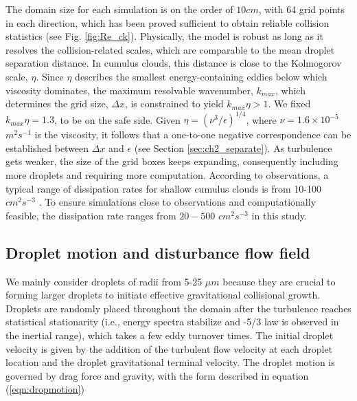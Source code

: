 The domain size for each simulation is on the order of $10cm$, with 64 grid points in each direction, which has been proved sufficient to obtain reliable collision statistics (see Fig. \ref{fig:Re_ck}). Physically, the model is robust as long as it resolves the collision-related scales, which are comparable to the mean droplet separation distance. In cumulus clouds, this distance is close to the Kolmogorov scale, $\eta$. Since $\eta$ describes the smallest energy-containing eddies below which viscosity dominates, the maximum resolvable wavenumber, $k_{max}$, which determines the grid size, $\Delta x$, is constrained to yield $k_{max}\eta > 1$. We fixed $k_{max} \eta=1.3$, to be on the safe side. Given $\eta = (\nu^3/\epsilon)^{1/4}$, where $\nu=1.6 \times 10^{-5}$ $m^2s^{-1}$ is the viscosity, it follows that a one-to-one negative correspondence can be established between $\Delta x$ and $\epsilon$ (see Section \ref{sec:ch2_separate}). As turbulence gets weaker, the size of the grid boxes keeps expanding, consequently including more droplets and requiring more computation. According to observations, a typical range of dissipation rates for shallow cumulus clouds is from 10-100 $cm^2s^{-3}$ \citep{siebert2013}. To ensure simulations close to observations and computationally feasible, the dissipation rate ranges from $20-500 $ $cm^2s^{-3}$  in this study. 

\subsection{Droplet motion and disturbance flow field} \label{sec:ch3_drop}

We mainly consider droplets of radii from 5-25 $\mu m$ because they are crucial to forming larger droplets to initiate effective gravitational collisional growth. Droplets are randomly placed throughout the domain after the turbulence reaches statistical stationarity (i.e., energy spectra stabilize and -5/3 law is observed in the inertial range), which takes a few eddy turnover times. The initial droplet velocity is given by the addition of the turbulent flow velocity at each droplet location and the droplet gravitational terminal velocity. The droplet motion is governed by drag force and gravity, with the form described in equation (\ref{eqn:dropmotion})


